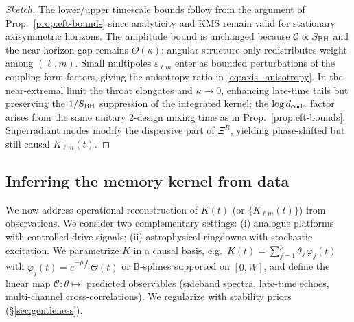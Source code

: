 \documentclass[a4paper,11pt]{article}
\theoremstyle{plain}
\theoremstyle{definition}
\theoremstyle{remark}
\begin{document}
\begin{proof}[Sketch]
The lower/upper timescale bounds follow from the argument of Prop.~\ref{prop:eft-bounds} since analyticity and KMS remain valid for
stationary axisymmetric horizons. The amplitude bound is unchanged because $\mathcal{C}\propto S_{\rm BH}$ and the near-horizon gap
remains $O(\kappa)$; angular structure only redistributes weight among $(\ell,m)$. Small multipoles $\varepsilon_{\ell m}$ enter as
bounded perturbations of the coupling form factors, giving the anisotropy ratio in \eqref{eq:axis_anisotropy}. In the near-extremal
limit the throat elongates and $\kappa\to 0$, enhancing late-time tails but preserving the $1/S_{\rm BH}$ suppression of the integrated
kernel; the $\log d_{\rm code}$ factor arises from the same unitary $2$-design mixing time as in Prop.~\ref{prop:eft-bounds}. Superradiant
modes modify the dispersive part of $\Xi^R$, yielding phase-shifted but still causal $K_{\ell m}(t)$.\end{proof}

\subsection{Inferring the memory kernel from data}
\label{sec:inference}
We now address operational reconstruction of $K(t)$ (or $\{K_{\ell m}(t)\}$) from observations. We consider two complementary
settings: (i) analogue platforms with controlled drive signals; (ii) astrophysical ringdowns with stochastic excitation.
We parametrize $K$ in a causal basis, e.g.\ $K(t)=\sum_{j=1}^{p}\theta_j\,\varphi_j(t)$ with $\varphi_j(t)=e^{-\mu_j t}\,\Theta(t)$
or B-splines supported on $[0,W]$, and define the linear map $\mathcal{C}:\theta\mapsto$ predicted observables (sideband spectra,
late-time echoes, multi-channel cross-correlations). We regularize with stability priors (\S\ref{sec:gentleness}).
\end{document}
